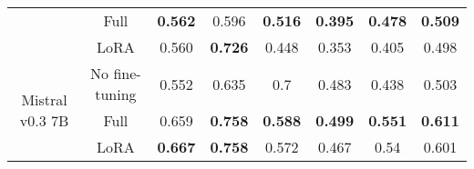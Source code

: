\begin{table}[ht]
\begin{center}
\begin{tabular}{@{}cccccccc@{}}
                        & \multicolumn{1}{c|}{Full} & \textbf{0.562}          & 0.596 & \textbf{0.516}   & \textbf{0.395} & \textbf{0.478}   & \textbf{0.509}   \\
                                                   & \multicolumn{1}{c|}{LoRA} & 0.560          & \textbf{0.726} & 0.448   & 0.353 & 0.405   & 0.498   \\\midrule
\multirow{3}{*}{Mistral v0.3 7B}                   & \multicolumn{1}{c|}{No fine-tuning} & 0.552 & 0.635 & 0.7                       & 0.483                     & 0.438                     & 0.503   \\
                   & \multicolumn{1}{c|}{Full} & 0.659          & \textbf{0.758} & \textbf{0.588}   & \textbf{0.499 }& \textbf{0.551}   & \textbf{0.611}   \\
                                                   & \multicolumn{1}{c|}{LoRA} & \textbf{0.667}          & \textbf{0.758} & 0.572   & 0.467 & 0.54    & 0.601   \\ \bottomrule
\end{tabular}
\end{center}
\vskip -0.1in
\end{table}

